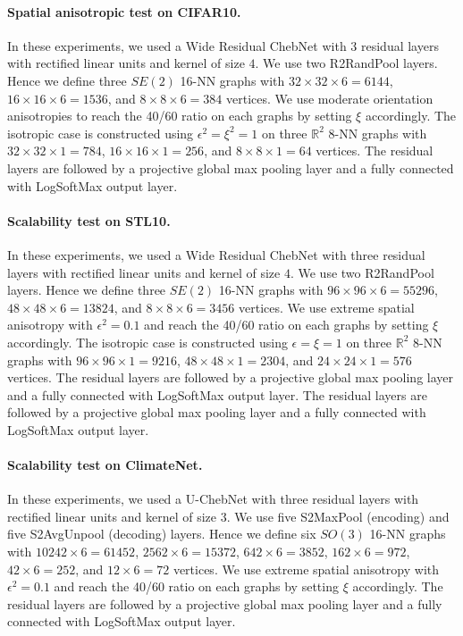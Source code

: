 \documentclass{article}
\begin{document}
\paragraph{Spatial anisotropic test on CIFAR10.} In these experiments, we used a Wide Residual ChebNet with 3 residual layers with rectified linear units and kernel of size $4$. We use two R2RandPool layers. Hence we define three $SE(2)$ 16-NN graphs with $32 \times 32 \times 6= 6144$, $16 \times 16 \times 6 = 1536$, and $8 \times 8 \times 6 = 384$ vertices. We use moderate orientation anisotropies to reach the 40/60 ratio on each graphs by setting $\xi$ accordingly. The isotropic case is constructed using $\epsilon^2 = \xi^2 = 1$ on three $\mathbb{R}^2$ 8-NN graphs with $32 \times 32 \times 1 = 784$, $16 \times 16 \times 1 = 256$, and $8 \times 8 \times 1 = 64$ vertices. The residual layers are followed by a projective global max pooling layer and a fully connected with LogSoftMax output layer.

\paragraph{Scalability test on STL10.} In these experiments, we used a Wide Residual ChebNet with three residual layers with rectified linear units and kernel of size $4$. We use two R2RandPool layers. Hence we define three $SE(2)$ 16-NN graphs with $96 \times 96 \times 6= 55296$, $48 \times 48 \times 6 = 13824$, and $8 \times 8 \times 6 = 3456$ vertices. We use extreme spatial anisotropy with $\epsilon^2 = 0.1$ and reach the 40/60 ratio on each graphs by setting $\xi$ accordingly. The isotropic case is constructed using $\epsilon = \xi = 1$ on three $\mathbb{R}^2$ 8-NN graphs with $96 \times 96 \times 1 = 9216$, $48 \times 48 \times 1 = 2304$, and $24 \times 24 \times 1 = 576$ vertices. The residual layers are followed by a projective global max pooling layer and a fully connected with LogSoftMax output layer. The residual layers are followed by a projective global max pooling layer and a fully connected with LogSoftMax output layer.

\paragraph{Scalability test on ClimateNet.} In these experiments, we used a U-ChebNet with three residual layers with rectified linear units and kernel of size $3$. We use five S2MaxPool (encoding) and five S2AvgUnpool (decoding) layers. Hence we define six $SO(3)$ 16-NN graphs with $10242 \times 6= 61452$, $2562 \times 6 = 15372$, $642 \times 6 = 3852$, $162 \times 6 = 972$, $42 \times 6 = 252$, and $12 \times 6 = 72$ vertices. We use extreme spatial anisotropy with $\epsilon^2 = 0.1$ and reach the 40/60 ratio on each graphs by setting $\xi$ accordingly. The residual layers are followed by a projective global max pooling layer and a fully connected with LogSoftMax output layer.
\end{document}
